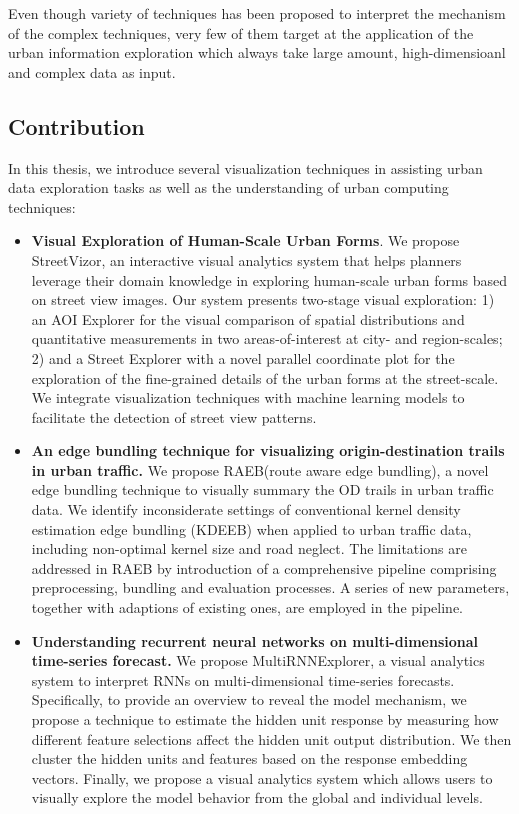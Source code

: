 Even though variety of techniques has been proposed to interpret the mechanism of the complex techniques, very few of them target at the application of the urban information exploration which always take large amount, high-dimensioanl and complex data as input.  

\subsection{Contribution}
In this thesis, we introduce several visualization techniques in assisting urban data exploration tasks as well as the understanding of urban computing techniques:

\begin{itemize}[noitemsep]
	\item \textbf{Visual Exploration of Human-Scale Urban Forms}. We propose StreetVizor, an interactive visual analytics system that helps planners leverage their domain knowledge in exploring human-scale urban forms based on street view images. Our system presents two-stage visual exploration: 1) an AOI Explorer for the visual comparison of spatial distributions and quantitative measurements in two areas-of-interest at city- and region-scales; 2) and a Street Explorer with a novel parallel coordinate plot for the exploration of the fine-grained details of the urban forms at the street-scale. We integrate visualization techniques with machine learning models to facilitate the detection of street view patterns. 
	\item \textbf{An edge bundling technique for visualizing origin-destination trails in urban traffic.} We propose RAEB(route aware edge bundling), a novel edge bundling technique to visually summary the OD trails in urban traffic data. We identify inconsiderate settings of conventional kernel density estimation edge bundling (KDEEB) when applied to urban traffic data, including non-optimal kernel size and road neglect. The limitations are addressed in RAEB by introduction of a comprehensive pipeline comprising preprocessing, bundling and evaluation processes. A series of new parameters, together with adaptions of existing ones, are employed in the pipeline. 
	\item \textbf{Understanding recurrent neural networks on multi-dimensional time-series forecast.} We propose MultiRNNExplorer, a visual analytics system to interpret RNNs on multi-dimensional time-series forecasts.  
	Specifically, to provide an overview to reveal the model mechanism, we propose a technique to estimate the hidden unit response by measuring how different feature selections affect the hidden unit output distribution. 
	We then cluster the hidden units and features based on the response embedding vectors. 
	Finally, we propose a visual analytics system which allows users to visually explore the model behavior from the global and individual levels.
\end{itemize}


